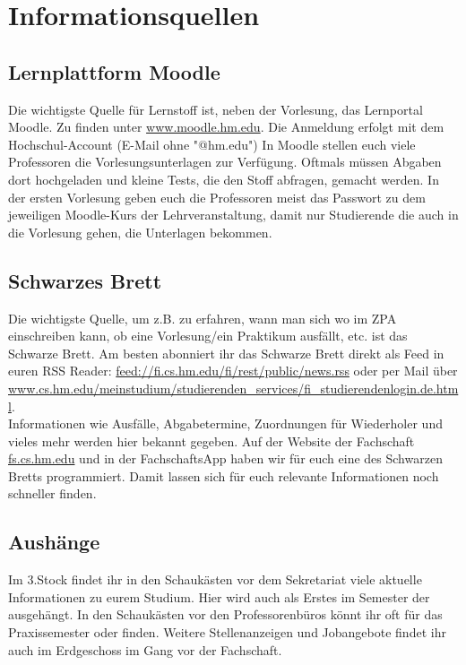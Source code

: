 \section{Informationsquellen}

\subsection{Lernplattform Moodle}
Die wichtigste Quelle für Lernstoff ist, neben der Vorlesung, das Lernportal Moodle. Zu finden unter \url{www.moodle.hm.edu}.
Die Anmeldung erfolgt mit dem Hochschul-Account (E-Mail ohne "@hm.edu")\doublebreak
In Moodle stellen euch viele Professoren die Vorlesungsunterlagen zur Verfügung. Oftmals müssen Abgaben dort hochgeladen und kleine Tests, die den Stoff abfragen, gemacht werden.
In der ersten Vorlesung geben euch die Professoren meist das Passwort zu dem jeweiligen Moodle-Kurs der Lehrveranstaltung, damit nur Studierende die auch in die Vorlesung gehen, die Unterlagen bekommen.

\subsection{Schwarzes Brett}
Die wichtigste Quelle, um z.B. zu erfahren, wann man sich wo im ZPA einschreiben kann, ob eine Vorlesung/ein Praktikum ausfällt, etc. ist das Schwarze Brett.\doublebreak 
Am besten abonniert ihr das Schwarze Brett direkt als Feed in euren RSS Reader: \url{feed://fi.cs.hm.edu/fi/rest/public/news.rss} oder per Mail über \url{www.cs.hm.edu/meinstudium/studierenden\_services/fi\_studierendenlogin.de.html}.\\
Informationen wie Ausfälle, Abgabetermine, Zuordnungen für Wiederholer und vieles mehr werden hier bekannt gegeben.
Auf der Website der Fachschaft \url{fs.cs.hm.edu} und in der FachschaftsApp haben wir für euch eine  des Schwarzen Bretts
programmiert. Damit lassen sich für euch relevante Informationen noch schneller finden.

\subsection{Aushänge}
Im 3.Stock findet ihr in den Schaukästen vor dem Sekretariat viele 
aktuelle Informationen zu eurem Studium. Hier wird auch als Erstes im 
Semester der  ausgehängt. In den
Schaukästen vor den Professorenbüros könnt ihr oft  
für das Praxissemester oder  finden. 
Weitere Stellenanzeigen und Jobangebote findet ihr auch im 
Erdgeschoss im Gang vor der Fachschaft. 

